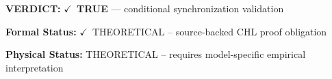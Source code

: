 \textbf{VERDICT:} \ensuremath{\checkmark}\ \textbf{TRUE} --- conditional synchronization validation

\textbf{Formal Status:} \ensuremath{\checkmark}\ THEORETICAL -- source-backed CHL proof obligation

\textbf{Physical Status:} THEORETICAL -- requires model-specific empirical interpretation
\par\vspace{0.45em}
\par
\ifTZPDarkEdition
{}
\fi
\endgroup
\endgroup

